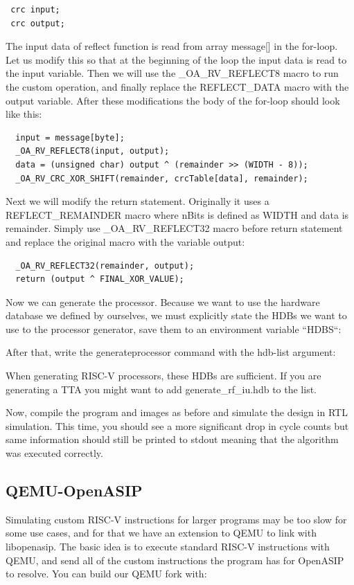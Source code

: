 \documentclass[a4paper,twoside]{tceusermanual}
\begin{document}
\begin{verbatim}
 crc input;
 crc output;
\end{verbatim}

The input data of reflect function is read from array message[] in the for-loop.
Let us modify this so that at the beginning of the loop the input data is
read to the input variable. Then we will use the \_OA\_RV\_REFLECT8 macro to run
the custom operation, and finally replace the REFLECT\_DATA macro with the
output variable. After these modifications the body of the for-loop should
look like this:

\begin{verbatim}
  input = message[byte];
  _OA_RV_REFLECT8(input, output);
  data = (unsigned char) output ^ (remainder >> (WIDTH - 8));
  _OA_RV_CRC_XOR_SHIFT(remainder, crcTable[data], remainder);
\end{verbatim}

   
Next we will modify the return statement. Originally it uses a
REFLECT\_REMAINDER macro where nBits is defined as WIDTH and data is
remainder. Simply use \_OA\_RV\_REFLECT32 macro before return statement and
replace the original macro with the variable output:
\begin{verbatim}
  _OA_RV_REFLECT32(remainder, output);
  return (output ^ FINAL_XOR_VALUE);
\end{verbatim}

Now we can generate the processor. Because we want to use the hardware database
we defined by ourselves, we must explicitly state the HDBs we want to use to the
processor generator, save them to an environment variable ``HDBS``:


After that, write the generateprocessor command with the hdb-list argument:


When generating RISC-V processors, these HDBs are sufficient. If you are
generating a TTA you might want to add generate\_rf\_iu.hdb to the list.

Now, compile the program and images as before and simulate the design in RTL
simulation. This time, you should see a more significant drop in cycle counts
but same information should still be printed to stdout meaning that the algorithm
was executed correctly.

\subsection{QEMU-OpenASIP}
Simulating custom RISC-V instructions for larger programs may be too slow for 
some use cases, and for that we have an extension to QEMU to link with libopenasip.
The basic idea is to execute standard RISC-V instructions with QEMU, and send all of the
custom instructions the program has for OpenASIP to resolve. You can build our QEMU fork with:
\end{document}
